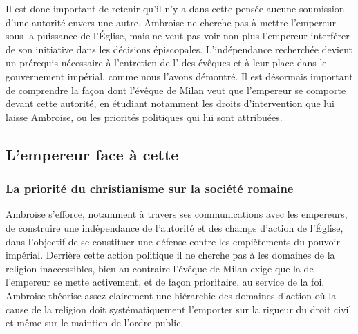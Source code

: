 \bigskip

Il est donc important de retenir qu’il n’y a dans cette pensée aucune soumission d’une autorité envers une autre. Ambroise ne cherche pas à mettre l’empereur sous la puissance de l'Église, mais ne veut pas voir non plus l’empereur interférer de son initiative dans les décisions épiscopales. L’indépendance recherchée devient un prérequis nécessaire à l’entretien de l’ des évêques et à leur place dans le gouvernement impérial, comme nous l'avons démontré. Il est désormais important de comprendre la façon dont l’évêque de Milan veut que l’empereur se comporte devant cette autorité, en étudiant notamment les droits d’intervention que lui laisse Ambroise, ou les priorités politiques qui lui sont attribuées.

\bigskip

\subsection{L'empereur face à cette }

\subsubsection{La priorité du christianisme sur la société romaine}

Ambroise s’efforce, notamment à travers ses communications avec les empereurs, de construire une indépendance de l’autorité et des champs d’action de l’Église, dans l’objectif de se constituer une défense contre les empiètements du pouvoir impérial. Derrière cette action politique il ne cherche pas à les domaines de la religion inaccessibles, bien au contraire l’évêque de Milan exige que la  de l’empereur se mette activement, et de façon prioritaire, au service de la foi. Ambroise théorise assez clairement une hiérarchie des domaines d’action où la cause de la religion doit systématiquement l’emporter sur la rigueur du droit civil et même sur le maintien de l'ordre public.

\bigskip

